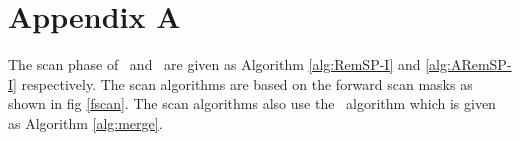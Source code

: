 \appendix

\section{Appendix A}
\label{appendix}

The scan phase of \remsp\ and \aremsp\ are given as Algorithm \ref{alg:RemSP-I}
and \ref{alg:ARemSP-I} respectively. The scan algorithms are based on the
forward scan masks as shown in fig \ref{fscan}. The scan algorithms also use the
\merge\ algorithm which is given as Algorithm \ref{alg:merge}.
